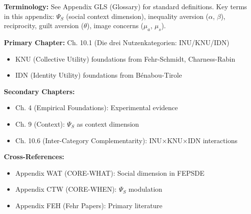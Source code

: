 \begin{tcolorbox}[colback=gray!5!white, colframe=gray!50!black]
\textbf{Terminology:} See Appendix GLS (Glossary) for standard definitions.
Key terms in this appendix: $\Psi_S$ (social context dimension),
inequality aversion ($\alpha$, $\beta$), reciprocity, guilt aversion ($\theta$),
image concerns ($\mu_a$, $\mu_s$).
\end{tcolorbox}

\begin{tcolorbox}[colback=green!5!white, colframe=green!75!black,
    title=\textbf{Chapter References}]

\textbf{Primary Chapter:} Ch. 10.1 (Die drei Nutzenkategorien: INU/KNU/IDN)
\begin{itemize}[nosep]
    \item KNU (Collective Utility) foundations from Fehr-Schmidt, Charness-Rabin
    \item IDN (Identity Utility) foundations from Bénabou-Tirole
\end{itemize}

\textbf{Secondary Chapters:}
\begin{itemize}[nosep]
    \item Ch. 4 (Empirical Foundations): Experimental evidence
    \item Ch. 9 (Context): $\Psi_S$ as context dimension
    \item Ch. 10.6 (Inter-Category Complementarity): INU×KNU×IDN interactions
\end{itemize}

\textbf{Cross-References:}
\begin{itemize}[nosep]
    \item Appendix WAT (CORE-WHAT): Social dimension in FEPSDE
    \item Appendix CTW (CORE-WHEN): $\Psi_S$ modulation
    \item Appendix FEH (Fehr Papers): Primary literature
\end{itemize}

\end{tcolorbox}

